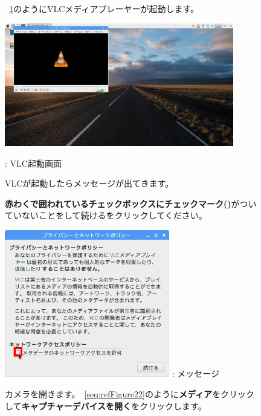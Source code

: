 \documentclass[a4paper,12pt]{jarticle}
\begin{document}
\begin{figure}[ht]
  ~\ref{seq:refFigure20}のようにVLCメディアプレーヤーが起動します。



  \centering
  \begin{minipage}{10cm}
    \includegraphics[width=10cm]{textbook-img114.jpg}


    {\theFigure\label{seq:refFigure20}}: VLC起動画面
  \end{minipage}
  \flushleft
  VLCが起動したらメッセージが出てきます。

  \textbf{\textcolor[rgb]{1.0,0.2,0.2}{赤わくで囲われているチェックボックスにチェックマーク(\CheckedBox)}}がついていないことをして続けるをクリックしてください。



  \centering
  \begin{minipage}{7.186cm}
    {\upshape
      \includegraphics[width=7.2cm]{textbook-img115.png}
      \newline
      : メッセージ}
  \end{minipage}

  \flushleft
  カメラを開きます。~\ref{seq:refFigure22}のように\textbf{メディア}をクリックして\textbf{キャプチャーデバイスを開く}をクリックします。



\end{figure}
\end{document}
